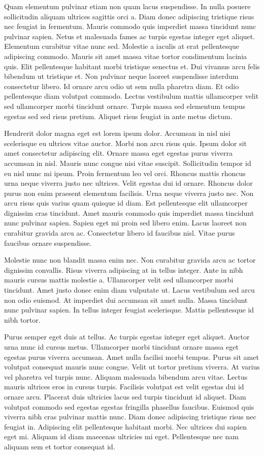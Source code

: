 \documentclass[11pt,a4paper]{article}
\begin{document}
Quam elementum pulvinar etiam non quam lacus suspendisse. In nulla posuere sollicitudin aliquam ultrices sagittis orci a. Diam donec adipiscing tristique risus nec feugiat in fermentum. Mauris commodo quis imperdiet massa tincidunt nunc pulvinar sapien. Netus et malesuada fames ac turpis egestas integer eget aliquet. Elementum curabitur vitae nunc sed. Molestie a iaculis at erat pellentesque adipiscing commodo. Mauris sit amet massa vitae tortor condimentum lacinia quis. Elit pellentesque habitant morbi tristique senectus et. Dui vivamus arcu felis bibendum ut tristique et. Non pulvinar neque laoreet suspendisse interdum consectetur libero. Id ornare arcu odio ut sem nulla pharetra diam. Et odio pellentesque diam volutpat commodo. Lectus vestibulum mattis ullamcorper velit sed ullamcorper morbi tincidunt ornare. Turpis massa sed elementum tempus egestas sed sed risus pretium. Aliquet risus feugiat in ante metus dictum.

Hendrerit dolor magna eget est lorem ipsum dolor. Accumsan in nisl nisi scelerisque eu ultrices vitae auctor. Morbi non arcu risus quis. Ipsum dolor sit amet consectetur adipiscing elit. Ornare massa eget egestas purus viverra accumsan in nisl. Mauris nunc congue nisi vitae suscipit. Sollicitudin tempor id eu nisl nunc mi ipsum. Proin fermentum leo vel orci. Rhoncus mattis rhoncus urna neque viverra justo nec ultrices. Velit egestas dui id ornare. Rhoncus dolor purus non enim praesent elementum facilisis. Urna neque viverra justo nec. Non arcu risus quis varius quam quisque id diam. Est pellentesque elit ullamcorper dignissim cras tincidunt. Amet mauris commodo quis imperdiet massa tincidunt nunc pulvinar sapien. Sapien eget mi proin sed libero enim. Lacus laoreet non curabitur gravida arcu ac. Consectetur libero id faucibus nisl. Vitae purus faucibus ornare suspendisse.

Molestie nunc non blandit massa enim nec. Non curabitur gravida arcu ac tortor dignissim convallis. Risus viverra adipiscing at in tellus integer. Ante in nibh mauris cursus mattis molestie a. Ullamcorper velit sed ullamcorper morbi tincidunt. Amet justo donec enim diam vulputate ut. Lacus vestibulum sed arcu non odio euismod. At imperdiet dui accumsan sit amet nulla. Massa tincidunt nunc pulvinar sapien. In tellus integer feugiat scelerisque. Mattis pellentesque id nibh tortor.

Purus semper eget duis at tellus. Ac turpis egestas integer eget aliquet. Auctor urna nunc id cursus metus. Ullamcorper morbi tincidunt ornare massa eget egestas purus viverra accumsan. Amet nulla facilisi morbi tempus. Purus sit amet volutpat consequat mauris nunc congue. Velit ut tortor pretium viverra. At varius vel pharetra vel turpis nunc. Aliquam malesuada bibendum arcu vitae. Lectus mauris ultrices eros in cursus turpis. Facilisis volutpat est velit egestas dui id ornare arcu. Placerat duis ultricies lacus sed turpis tincidunt id aliquet. Diam volutpat commodo sed egestas egestas fringilla phasellus faucibus. Euismod quis viverra nibh cras pulvinar mattis nunc. Diam donec adipiscing tristique risus nec feugiat in. Adipiscing elit pellentesque habitant morbi. Nec ultrices dui sapien eget mi. Aliquam id diam maecenas ultricies mi eget. Pellentesque nec nam aliquam sem et tortor consequat id.
\end{document}
